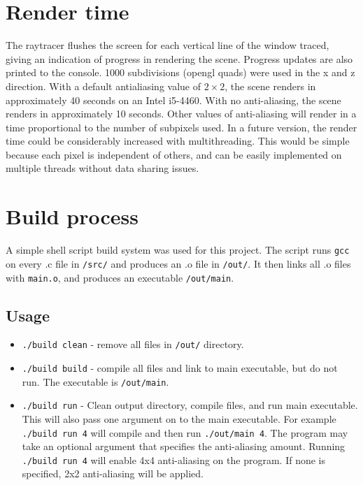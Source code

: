 \documentclass[11pt]{article}
\begin{document}
\section{Render time}
The raytracer flushes the screen for each vertical line of the window traced, giving an indication of progress in rendering the scene. Progress updates are also printed to the console. 1000 subdivisions (opengl quads) were used in the x and z direction. With a default antialiasing value of $2\times 2$, the scene renders in approximately 40 seconds on an Intel i5-4460. With no anti-aliasing, the scene renders in approximately 10 seconds. Other values of anti-aliasing will render in a time proportional to the number of subpixels used. In a future version, the render time could be considerably increased with multithreading. This would be simple because each pixel is independent of others, and can be easily implemented on multiple threads without data sharing issues.

\section{Build process}
A simple shell script build system was used for this project. The script runs \verb|gcc| on every .c file in \verb|/src/| and produces an .o file in \verb|/out/|. It then links all .o files with \verb|main.o|, and produces an executable \verb|/out/main|.
\subsection{Usage}
\begin{itemize}
    \item \verb|./build clean| - remove all files in \verb|/out/| directory.
    \item \verb|./build build| - compile all files and link to main executable, but do not run. The executable is \verb|/out/main|.
    \item \verb|./build run| - Clean output directory, compile files, and run main executable. This will also pass one argument on to the main executable. For example \verb|./build run 4| will compile and then run \verb|./out/main 4|. The program may take an optional argument that specifies the anti-aliasing amount. Running \verb|./build run 4| will enable 4x4 anti-aliasing on the program. If none is specified, 2x2 anti-aliasing will be applied.
\end{itemize}
\end{document}
